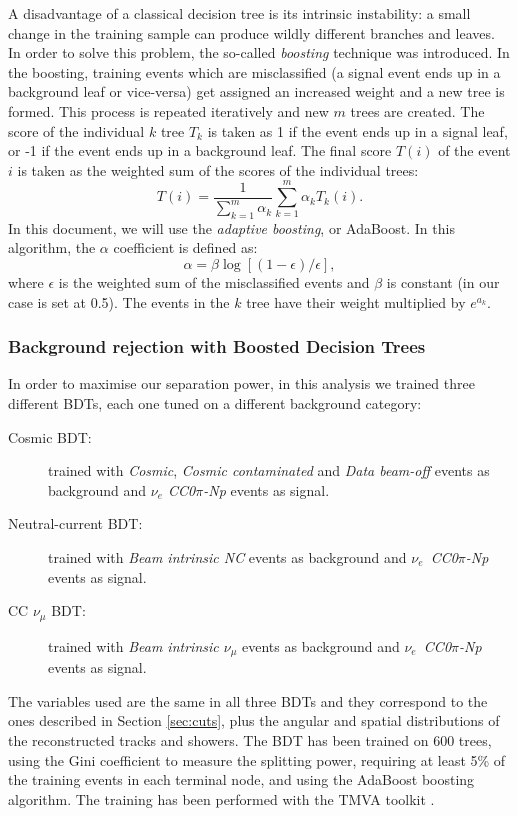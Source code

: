 A disadvantage of a classical decision tree is its intrinsic instability: a small change in the training sample can produce wildly different branches and leaves. In order to solve this problem, the so-called \emph{boosting} technique was introduced. In the boosting, training events which are misclassified (a signal event ends up in a background leaf or vice-versa) get assigned an increased weight and a new tree is formed. This process is repeated iteratively and new $m$ trees are created. The score of the individual $k$ tree $T_k$ is taken as 1 if the event ends up in a signal leaf, or -1 if the event ends up in a background leaf.  The final score $T(i)$ of the event $i$ is taken as the weighted sum of the scores of the individual trees:
\begin{equation}
    T(i) = \frac{1}{\sum^m_{k=1} \alpha_k} \sum^m_{k=1}\alpha_k T_k(i).
\end{equation}
In this document, we will use the \emph{adaptive boosting}, or AdaBoost. In this algorithm, the $\alpha$ coefficient is defined as:
\begin{equation}
    \alpha = \beta \log[(1-\epsilon)/\epsilon],
\end{equation}
where $\epsilon$ is the weighted sum of the misclassified events and $\beta$ is constant (in our case is set at 0.5). The events in the $k$ tree have their weight multiplied by $e^{a_k}$.

\subsubsection{Background rejection with Boosted Decision Trees}
In order to maximise our separation power, in this analysis we trained three different BDTs, each one tuned on a different background category:
\begin{description}
\item[Cosmic BDT:] trained with \emph{Cosmic}, \emph{Cosmic contaminated} and \emph{Data beam-off} events as background and \emph{$\nu_e$ CC0$\pi$-Np} events as signal. 
\item[Neutral-current BDT:] trained with \emph{Beam intrinsic NC} events as background and \emph{$\nu_e$~CC0$\pi$-Np} events as signal. 
\item[CC $\nu_{\mu}$ BDT:] trained with \emph{Beam intrinsic $\nu_{\mu}$} events as background and \emph{$\nu_e$~CC0$\pi$-Np} events as signal. 
\end{description}

The variables used are the same in all three BDTs and they correspond to the ones described in Section \ref{sec:cuts}, plus the angular and spatial distributions of the reconstructed tracks and showers. The BDT has been trained on 600 trees, using the Gini coefficient to measure the splitting power, requiring at least 5\% of the training events in each terminal node, and using the AdaBoost boosting algorithm. The training has been performed with the TMVA toolkit \cite{Hocker:2007ht}. 

